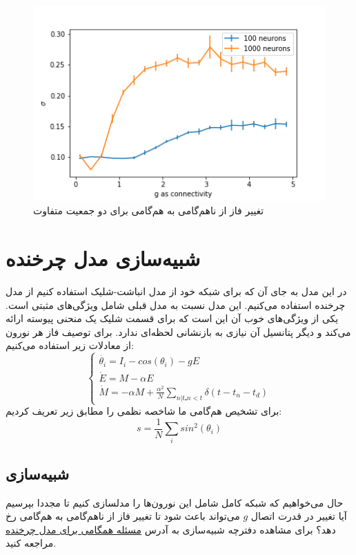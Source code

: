 \documentclass[12pt,onecolumn,a4paper]{article}
\begin{document}
\begin{figure}
\centering
  \includegraphics[width = 10 cm]{../scripts/kuramoto_model_synchoronization_problem/two_pops_sigma.png}
 \caption{تغییر فاز از ناهم‌گامی به هم‌گامی برای دو جمعیت متفاوت}
  \label{fig:two_pops_sync}
\end{figure}

\section{شبیه‌سازی مدل چرخنده}
در این مدل به جای آن که برای شبکه خود از مدل انباشت-شلیک استفاده کنیم از مدل چرخنده استفاده می‌کنیم. این مدل نسبت به مدل قبلی شامل ویژگی‌های مثبتی است. یکی از ویژگی‌های خوب آن این است که برای قسمت شلیک یک منحنی پیوسته ارائه می‌کند و دیگر پتانسیل آن نیازی به بازنشانی لحظه‌ای ندارد. برای توصیف فاز هر نورون از معادلات زیر استفاده می‌کنیم:
\begin{equation}
\begin{cases}
\dot{\theta_i}=I_i - cos(\theta_i) - g E \\
\dot{E} = M - \alpha E\\
\dot{M} = -  \alpha M + \frac{ \alpha^{2} }{N} \sum_{n|tـn<t} \delta(t - t_n - t_d)
\end{cases}
\end{equation}
برای تشخیص هم‌گامی ما شاخصه نظمی را مطابق زیر تعریف کردیم:
\begin{equation}
s = \frac{1}{N} \sum_{i} sin^{2}(\theta_i)
\end{equation}

\subsection{شبیه‌سازی}
حال می‌خواهیم که شبکه کامل شامل این نورون‌ها را مدلسازی کنیم تا مجددا بپرسیم آیا تغییر در قدرت اتصال $g$ می‌تواند باعث شود تا تغییر فاز از ناهم‌گامی به هم‌گامی رخ دهد؟ برای مشاهده دفترچه شبیه‌سازی به آدرس 
\href{run://..//scripts//rotational_model}{مسئله همگامی برای مدل چرخنده}
مراجعه کنید.
\end{document}
